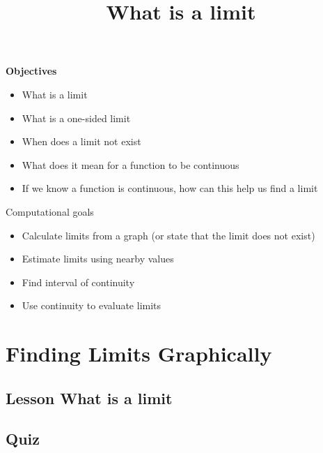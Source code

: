 \documentclass{ximera}
\title{What is a limit}
\newenvironment{objectives}{\begin{remark}\textbf{Objectives}}{\end{remark}}
\begin{document}
\begin{abstract}
\end{abstract}

\maketitle


\begin{objectives}


\begin{itemize}
   \item What is a limit
   \item What is a one-sided limit
    \item When does a limit not exist
    \item What does it mean for a function to be continuous
    \item If we know a function is continuous, how can this help us find a limit
\end{itemize}

Computational goals

\begin{itemize}
    \item Calculate limits from a graph (or state that the limit does not exist)
    \item Estimate limits using nearby values
    \item Find interval of continuity
    \item Use continuity to evaluate limits
\end{itemize}


\end{objectives}

\section{Finding Limits Graphically}
\subsection{Lesson What is a limit}

\begin{center}  
\end{center}

\subsection{Quiz}
\end{document}
